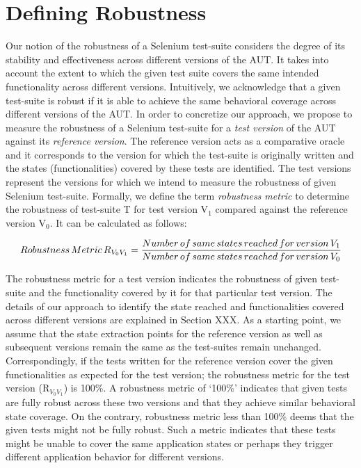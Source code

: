 \section{Defining Robustness}
\label{sec:DefiningRobustness}
Our notion of the robustness of a Selenium test-suite considers the degree of its stability and effectiveness across different versions of the AUT. It takes into account the extent to which the given test suite covers the same intended functionality across different versions. Intuitively, we acknowledge that a given test-suite is robust if it is able to achieve the same behavioral coverage across different versions of the AUT. In order to concretize our approach, we propose to measure the robustness of a Selenium test-suite for a \textit{test version} of the AUT against its \textit{reference version}. The reference version acts as a comparative oracle and it corresponds to the version for which the test-suite is originally written and the states (functionalities) covered by these tests are identified. The test versions represent the versions for which we intend to measure the robustness of given Selenium test-suite. Formally, we define the term \textit{
robustness metric} to determine the robustness of test-suite T for test version V$_{1}$ compared against the reference version V$_{0}$. It can be calculated as follows:


$$Robustness \thinspace Metric \thinspace R_{V_{0}V_{1}} = \displaystyle \frac{Number\thinspace of \thinspace same \thinspace states \thinspace reached \thinspace for \thinspace version \thinspace V_{1}}{Number \thinspace of \thinspace same \thinspace states \thinspace reached  \thinspace for \thinspace  version \thinspace V_{0}}\normalsize$$

The robustness metric for a test version indicates the robustness of given test-suite and the functionality covered by it for that particular test version. The details of our approach to identify the state reached and functionalities covered across different versions are explained in Section XXX. As a starting point, we assume that the state extraction points for the reference version as well as subsequent versions remain the same as the test-suites remain unchanged. Correspondingly, if the tests written for the reference version cover the given functionalities as expected for the test version; the robustness metric for the test version (R$_{V_{0}V_{1}}$) is 100\%. A robustness metric of ‘100\%’ indicates that given tests are fully robust across these two versions and that they achieve similar behavioral state coverage. On the contrary, robustness metric less than 100\% deems that the given tests might not be fully robust. Such a metric indicates that these tests might be unable to cover the same application states or perhaps they trigger different application behavior for different versions. 

